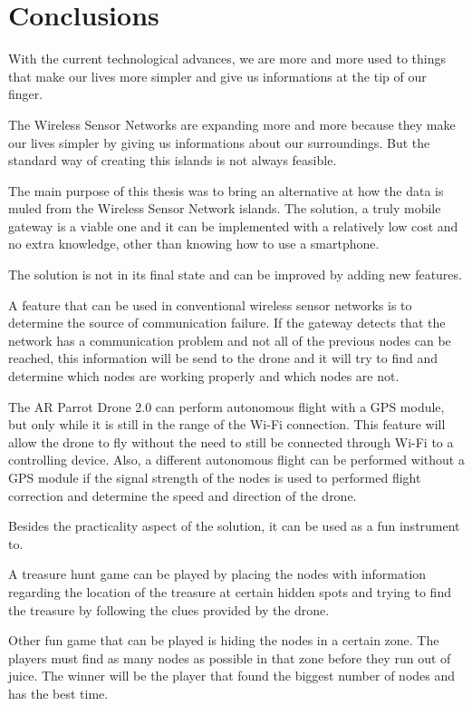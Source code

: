 \chapter{Conclusions}

With the current technological advances, we are more and more used to things that make our lives more simpler and give us informations at the tip of our finger. 

The Wireless Sensor Networks are expanding more and more because they make our lives simpler by giving us informations about our surroundings. But the standard way of creating this islands is not always feasible.

The main purpose of this thesis was to bring an alternative at how the data is muled from the Wireless Sensor Network islands. The solution, a truly mobile gateway is a viable one and it can be implemented with a relatively low cost and no extra knowledge, other than knowing how to use a smartphone.

The solution is not in its final state and can be improved by adding new features.

A feature that can be used in conventional wireless sensor networks is to determine the source of communication failure. If the gateway detects that the network has a communication problem and not all of the previous nodes can be reached, this information will be send to the drone and it will try to find and determine which nodes are working properly and which nodes are not.
 
The AR Parrot Drone 2.0 can perform autonomous flight with a GPS module, but only while it is still in the range of the Wi-Fi connection. This feature will allow the drone to fly without the need to still be connected through Wi-Fi to a controlling device. Also, a different autonomous flight can be performed without a GPS module if the signal strength of the nodes is used to performed flight correction and determine the speed and direction of the drone.


Besides the practicality aspect of the solution, it can be used as a fun instrument to. 

A treasure hunt game can be played by placing the nodes with information regarding the location of the treasure at certain hidden spots and trying to find the treasure by following the clues provided by the drone.

Other fun game that can be played is hiding the nodes in a certain zone. The players must find as many nodes as possible in that zone before they run out of juice. The winner will be the player that found the biggest number of nodes and has the best time.
